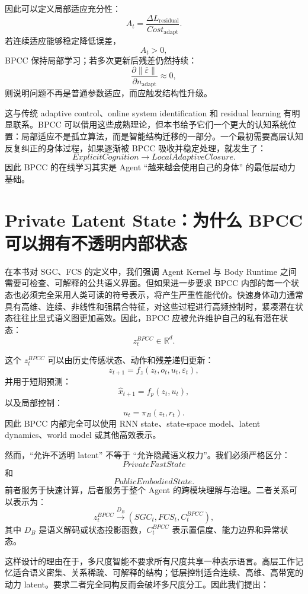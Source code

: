 因此可以定义局部适应充分性：
\[
A_t
=
\frac{
\Delta L_{\mathrm{residual}}
}{
Cost_{\mathrm{adapt}}
}.
\]
若连续适应能够稳定降低误差，
\[
A_t>0,
\]
BPCC 保持局部学习；若多次更新后残差仍然持续：
\[
\frac{\partial
\|\bar\varepsilon\|
}{
\partial n_{\mathrm{adapt}}
}
\approx0,
\]
则说明问题不再是普通参数适应，而应触发结构性升级。

这与传统 adaptive control、online system identification 和 residual learning 有明显联系。BPCC 可以借用这些成熟理论，但本书给予它们一个更大的认知系统位置：局部适应不是孤立算法，而是智能结构迁移的一部分。一个最初需要高层认知反复纠正的身体过程，如果逐渐被 BPCC 吸收并稳定处理，就发生了：
\[
ExplicitCognition
\rightarrow
LocalAdaptiveClosure.
\]
因此 BPCC 的在线学习其实是 Agent ``越来越会使用自己的身体'' 的最低层动力基础。

\section{Private Latent State：为什么 BPCC 可以拥有不透明内部状态}

在本书对 SGC、FCS 的定义中，我们强调 Agent Kernel 与 Body Runtime 之间需要可检查、可解释的公共语义界面。但如果进一步要求 BPCC 内部的每一个状态也必须完全采用人类可读的符号表示，将产生严重性能代价。快速身体动力通常具有高维、连续、非线性和强耦合特征，对这些过程进行高频控制时，紧凑潜在状态往往比显式语义图更加高效。因此，BPCC 应被允许维护自己的私有潜在状态：
\[
\boxed{
z_t^{BPCC}
\in
\mathbb R^d.
}
\]

这个 $z_t^{BPCC}$ 可以由历史传感状态、动作和残差递归更新：
\[
z_{t+1}
=
f_z
\left(
z_t,
o_t,
u_t,
\varepsilon_t
\right),
\]
并用于短期预测：
\[
\hat x_{t+1}
=
f_p(z_t,u_t),
\]
以及局部控制：
\[
u_t
=
\pi_B(z_t,r_t).
\]
因此 BPCC 内部完全可以使用 RNN state、state-space model、latent dynamics、world model 或其他高效表示。

然而，``允许不透明 latent'' 不等于 ``允许隐藏语义权力''。我们必须严格区分：
\[
PrivateFastState
\]
和
\[
PublicEmbodiedState.
\]
前者服务于快速计算，后者服务于整个 Agent 的跨模块理解与治理。二者关系可以表示为：
\[
z_t^{BPCC}
\xrightarrow{D_B}
(
SGC_t,FCS_t,C_t^{BPCC}
),
\]
其中 $D_B$ 是语义解码或状态投影函数，$C_t^{BPCC}$ 表示置信度、能力边界和异常状态。

这样设计的理由在于，多尺度智能不要求所有尺度共享一种表示语言。高层工作记忆适合语义密集、关系稀疏、可解释的结构；低层控制适合连续、高维、高带宽的动力 latent。要求二者完全同构反而会破坏多尺度分工。因此我们提出：
\begin{statementbox}
\centering
{}
\end{statementbox}

